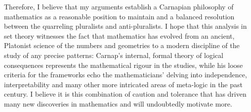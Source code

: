 \documentclass[12pt]{article}
\theoremstyle{plain}
\theoremstyle{definition}
\begin{document}
Therefore, I believe that my arguments establish a Carnapian philosophy of mathematics as a reasonable position to maintain and a balanced resolution between the quarreling pluralists and anti-pluralists. I hope that this analysis in set theory witnesses the fact that mathematics has evolved from an ancient, Platonist science of the numbers and geometries to a modern discipline of the study of any precise patterns: Carnap's internal, formal theory of logical consequences represents the mathematical rigour in the studies, while his loose criteria for the frameworks echo the mathematicians' delving into independence, interpretability and many other more intricated areas of meta-logic in the past century. I believe it is this combination of caution and tolerance that has driven many new discoveries in mathematics and will undoubtedly motivate more.
\end{document}
